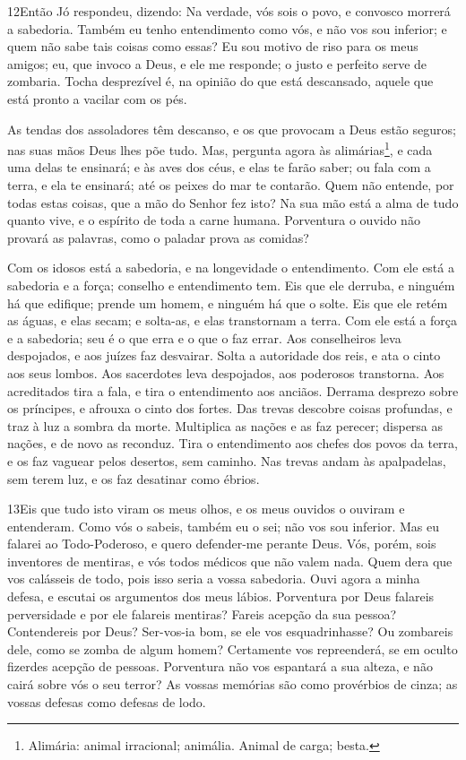 \medskip

\lettrine{12} Então Jó respondeu, dizendo: Na verdade, vós
sois o povo, e convosco morrerá a sabedoria. Também eu tenho
entendimento como vós, e não vos sou inferior; e quem não sabe tais
coisas como essas? Eu sou motivo de riso para os meus amigos;
eu, que invoco a Deus, e ele me responde; o justo e perfeito serve
de zombaria. Tocha desprezível é, na opinião do que está
descansado, aquele que está pronto a vacilar com os pés.

As tendas dos assoladores têm descanso, e os que provocam a Deus
estão seguros; nas suas mãos Deus lhes põe tudo. Mas, pergunta
agora às alimárias\footnote{Alimária: animal irracional; animália.
Animal de carga; besta.}, e cada uma delas te ensinará; e às aves
dos céus, e elas te farão saber; ou fala com a terra, e ela te
ensinará; até os peixes do mar te contarão. Quem não entende,
por todas estas coisas, que a mão do Senhor fez isto? Na sua
mão está a alma de tudo quanto vive, e o espírito de toda a carne
humana. Porventura o ouvido não provará as palavras, como o
paladar prova as comidas?

Com os idosos está a sabedoria, e na longevidade o entendimento.
Com ele está a sabedoria e a força; conselho e entendimento
tem. Eis que ele derruba, e ninguém há que edifique; prende
um homem, e ninguém há que o solte. Eis que ele retém as
águas, e elas secam; e solta-as, e elas transtornam a terra.
Com ele está a força e a sabedoria; seu é o que erra e o que
o faz errar. Aos conselheiros leva despojados, e aos juízes
faz desvairar. Solta a autoridade dos reis, e ata o cinto aos
seus lombos. Aos sacerdotes leva despojados, aos poderosos
transtorna. Aos acreditados tira a fala, e tira o
entendimento aos anciãos. Derrama desprezo sobre os
príncipes, e afrouxa o cinto dos fortes. Das trevas descobre
coisas profundas, e traz à luz a sombra da morte. Multiplica
as nações e as faz perecer; dispersa as nações, e de novo as
reconduz. Tira o entendimento aos chefes dos povos da terra,
e os faz vaguear pelos desertos, sem caminho. Nas trevas
andam às apalpadelas, sem terem luz, e os faz desatinar como ébrios.

\medskip

\lettrine{13} Eis que tudo isto viram os meus olhos, e os meus
ouvidos o ouviram e entenderam. Como vós o sabeis, também eu o
sei; não vos sou inferior. Mas eu falarei ao Todo-Poderoso, e
quero defender-me perante Deus. Vós, porém, sois inventores de
mentiras, e vós todos médicos que não valem nada. Quem dera que
vos calásseis de todo, pois isso seria a vossa sabedoria. Ouvi
agora a minha defesa, e escutai os argumentos dos meus lábios.
Porventura por Deus falareis perversidade e por ele falareis
mentiras? Fareis acepção da sua pessoa? Contendereis por Deus?
Ser-vos-ia bom, se ele vos esquadrinhasse? Ou zombareis dele,
como se zomba de algum homem? Certamente vos repreenderá, se
em oculto fizerdes acepção de pessoas. Porventura não vos
espantará a sua alteza, e não cairá sobre vós o seu terror?
As vossas memórias são como provérbios de cinza; as vossas
defesas como defesas de lodo.

